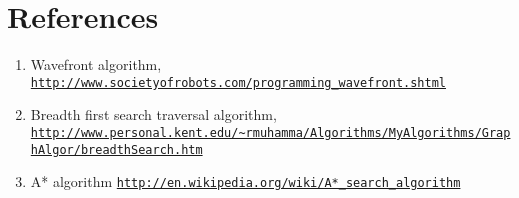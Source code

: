 \documentclass[12pt]{article}
\begin{document}
	

\section{References}
	\begin{enumerate}
	\item \label{item:1}Wavefront algorithm, \href{http://www.societyofrobots.com/programming_wavefront.shtml}{\nolinkurl{http://www.societyofrobots.com/programming_wavefront.shtml}}
	\item \label{item:2} Breadth first search traversal algorithm, \href{http://www.personal.kent.edu/~rmuhamma/Algorithms/MyAlgorithms/GraphAlgor/breadthSearch.htm}{\nolinkurl{http://www.personal.kent.edu/~rmuhamma/Algorithms/MyAlgorithms/GraphAlgor/breadthSearch.htm}}
	\item \label{item:3} A* algorithm \href{http://en.wikipedia.org/wiki/A*_search_algorithm}{\nolinkurl{http://en.wikipedia.org/wiki/A*_search_algorithm}}
	\end{enumerate}
\end{document}
